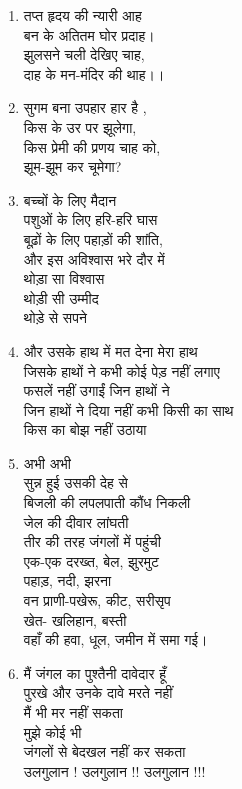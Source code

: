 \documentclass[11pt,a4paper]{article}
\begin{document}
\begin{enumerate}[label=(\roman*)]
  \item तप्त हृदय की न्यारी आह\\
  बन के अतितम घोर प्रदाह।\\
  झुलसने चली देखिए चाह,\\
  दाह के मन-मंदिर की थाह।।

  \item सुगम बना उपहार हार है ,\\
  किस के उर पर झूलेगा,\\
  किस प्रेमी की प्रणय चाह को,\\
  झूम-झूम कर चूमेगा?

  \item बच्चों के लिए मैदान\\
  पशुओं के लिए हरि-हरि घास\\
  बूढ़ों के लिए पहाड़ों की शांति,\\
  और इस अविश्वास भरे दौर में\\
  थोड़ा सा विश्वास\\
  थोड़ी सी उम्मीद\\
  थोड़े से सपने

  \item और उसके हाथ में मत देना मेरा हाथ\\
  जिसके हाथों ने कभी कोई पेड़ नहीं लगाए\\
  फसलें नहीं उगाईं जिन हाथों ने\\
  जिन हाथों ने दिया नहीं कभी किसी का साथ\\
  किस का बोझ नहीं उठाया

  \item अभी अभी\\
  सुन्न हुई उसकी देह से\\
  बिजली की लपलपाती कौंध निकली\\
  जेल की दीवार लांघती\\
  तीर की तरह जंगलों में पहुंची\\
  एक-एक दरख्त, बेल, झुरमुट\\
  पहाड़, नदी, झरना\\
  वन प्राणी-पखेरू, कीट, सरीसृप\\
  खेत- खलिहान, बस्ती\\
  वहाँ की हवा, धूल, जमीन में समा गई।

  \item मैं जंगल का पुश्तैनी दावेदार हूँ\\
  पुरखे और उनके दावे मरते नहीं\\
  मैं भी मर नहीं सकता\\
  मुझे कोई भी\\
  जंगलों से बेदखल नहीं कर सकता\\
  उलगुलान ! उलगुलान !! उलगुलान !!!
\end{enumerate}
\end{document}
